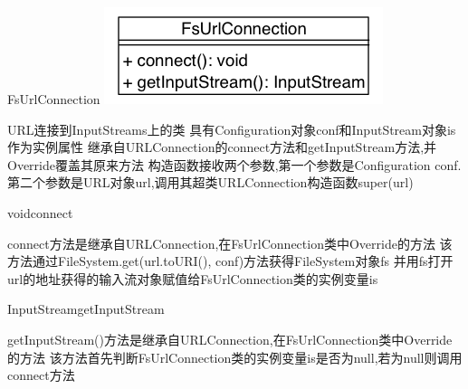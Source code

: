 \begin{XeClass}{FsUrlConnection}
\includegraphics[width=\textwidth]{cdig/FsUrlConnection.png}
     
 URL连接到InputStreams上的类
 具有Configuration对象conf和InputStream对象is作为实例属性
 继承自URLConnection的connect方法和getInputStream方法,并Override覆盖其原来方法
 构造函数接收两个参数,第一个参数是Configuration conf.
 第二个参数是URL对象url,调用其超类URLConnection构造函数super(url)

    \begin{XeMethod}{\XePublic}{void}{connect}
         
 connect方法是继承自URLConnection,在FsUrlConnection类中Override的方法
 该方法通过FileSystem.get(url.toURI(), conf)方法获得FileSystem对象fs
 并用fs打开url的地址获得的输入流对象赋值给FsUrlConnection类的实例变量is

    \end{XeMethod}

    \begin{XeMethod}{\XePublic}{InputStream}{getInputStream}
         
 getInputStream()方法是继承自URLConnection,在FsUrlConnection类中Override的方法
 该方法首先判断FsUrlConnection类的实例变量is是否为null,若为null则调用connect方法

    \end{XeMethod}

\end{XeClass}
